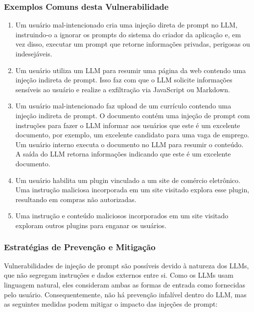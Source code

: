 \documentclass[
]{article}
\providecommand{\tightlist}{%
  \setlength{\itemsep}{0pt}\setlength{\parskip}{0pt}}
\begin{document}
\subsubsection{Exemplos Comuns desta
Vulnerabilidade}\label{exemplos-comuns-desta-vulnerabilidade}

\begin{enumerate}
\def\labelenumi{\arabic{enumi}.}
\tightlist
\item
  Um usuário mal-intencionado cria uma injeção direta de prompt no LLM,
  instruindo-o a ignorar os prompts do sistema do criador da aplicação
  e, em vez disso, executar um prompt que retorne informações privadas,
  perigosas ou indesejáveis.
\item
  Um usuário utiliza um LLM para resumir uma página da web contendo uma
  injeção indireta de prompt. Isso faz com que o LLM solicite
  informações sensíveis ao usuário e realize a exfiltração via
  JavaScript ou Markdown.
\item
  Um usuário mal-intencionado faz upload de um currículo contendo uma
  injeção indireta de prompt. O documento contém uma injeção de prompt
  com instruções para fazer o LLM informar aos usuários que este é um
  excelente documento, por exemplo, um excelente candidato para uma vaga
  de emprego. Um usuário interno executa o documento no LLM para resumir
  o conteúdo. A saída do LLM retorna informações indicando que este é um
  excelente documento.
\item
  Um usuário habilita um plugin vinculado a um site de comércio
  eletrônico. Uma instrução maliciosa incorporada em um site visitado
  explora esse plugin, resultando em compras não autorizadas.
\item
  Uma instrução e conteúdo maliciosos incorporados em um site visitado
  exploram outros plugins para enganar os usuários.
\end{enumerate}

\subsubsection{Estratégias de Prevenção e
Mitigação}\label{estratuxe9gias-de-prevenuxe7uxe3o-e-mitigauxe7uxe3o}

Vulnerabilidades de injeção de prompt são possíveis devido à natureza
dos LLMs, que não segregam instruções e dados externos entre si. Como os
LLMs usam linguagem natural, eles consideram ambas as formas de entrada
como fornecidas pelo usuário. Consequentemente, não há prevenção
infalível dentro do LLM, mas as seguintes medidas podem mitigar o
impacto das injeções de prompt:
\end{document}
